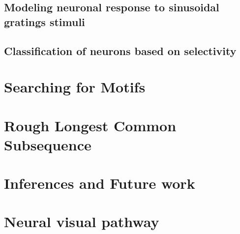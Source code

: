 \documentclass[MTech]{iitmdiss}
\begin{document}

\section{Modeling neuronal response to sinusoidal gratings stimuli} %
\label{sec:modeling_neuronal_response_to_sinusoidal_gratings_stimuli}


\section{Classification of neurons based on selectivity} %
\label{sec:classification_of_neurons_based_on_selectivity}

\chapter{Searching for Motifs}
\label{chap:searchmotif}

\chapter{Rough Longest Common Subsequence}
\label{chap:rlcs}

\chapter{Inferences and Future work}
\label{chap:summary}

\appendix
\chapter{Neural visual pathway}

\pagebreak
\begin{singlespace}
  \begin{small}
	
  \end{small}
\end{singlespace}
\end{document}
